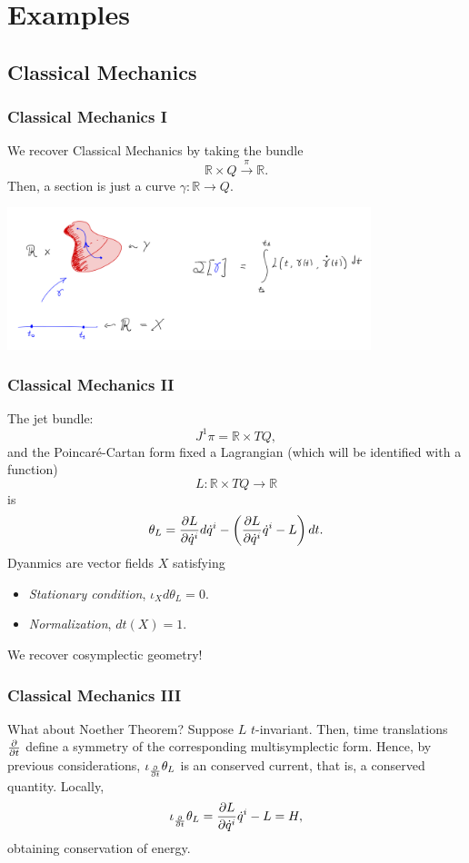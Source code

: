 \section{\bf Examples}

\subsection{Classical Mechanics}
\begin{frame}
    \frametitle{Classical Mechanics I}
    We recover Classical Mechanics by taking the bundle 
    $$\mathbb{R} \times Q \xrightarrow{\pi} \mathbb{R}.$$ 
    Then, a section is just a curve $\gamma: \mathbb{R} \rightarrow Q.$
    \begin{center}
        \includegraphics[width = 300pt]{Images/Classical_Mechanics.PNG}
    \end{center}
\end{frame}

\begin{frame}
    \frametitle{Classical Mechanics II}
    The jet bundle:
    $$J^1 \pi = \mathbb{R} \times TQ,$$
    and the \alert{Poincaré-Cartan} form fixed a Lagrangian (which will be identified with a function) $$L : \mathbb{R} \times TQ \rightarrow \mathbb{R}$$ is 
    $$\theta_L = \pdv{L}{\dot{q}^i}d \dot{q}^i - \left(\pdv{L}{\dot{q}^i} \dot{q}^i - L \right) dt.$$
    Dyanmics are vector fields $X$ satisfying 
    \begin{itemize}
        \item \textit{Stationary condition}, $\iota_X d \theta_L = 0.$
        \item \textit{Normalization}, $dt(X) = 1.$
    \end{itemize}
    We recover \alert{cosymplectic} geometry!
\end{frame}

\begin{frame}
    \frametitle{Classical Mechanics III}
    What about Noether Theorem?
    Suppose $L$ $t$-invariant. Then, time translations $\pdv{t}$ define a symmetry of the corresponding multisymplectic form.
    Hence, by previous considerations, $\iota_{\pdv{t}} \theta_L$ is an \alert{conserved current}, that is, a \alert{conserved quantity}.  
    Locally, $$\iota_{\pdv{t}} \theta_L = \pdv{L}{\dot{q}^i} \dot{q}^i - L = H,$$
    obtaining conservation of energy.
\end{frame}

